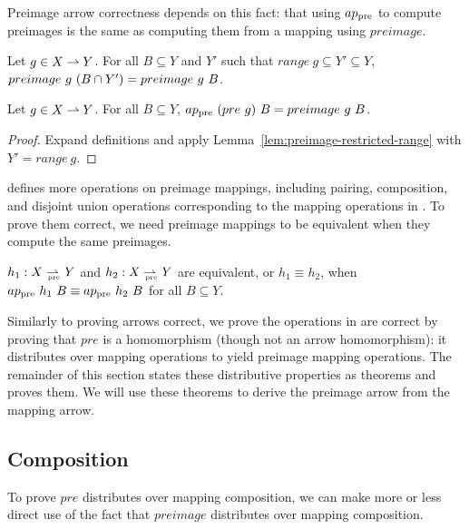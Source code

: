 Preimage arrow correctness depends on this fact: that using $ap_\mathrm{pre}$ to compute preimages is the same as computing them from a mapping using $preimage$.

\begin{lemma}
\label{lem:preimage-restricted-range}
Let $g \in X \rightharpoonup Y$.
For all $B \subseteq Y$ and $Y'$ such that $range~g \subseteq Y' \subseteq Y$, $preimage~g~(B \cap Y') = preimage~g~B$.%
\end{lemma}

\begin{theorem}
\label{thm:pre-like-preimage}
Let $g \in X \rightharpoonup Y$. For all $B \subseteq Y$, $ap_\mathrm{pre}~(pre~g)~B = preimage~g~B$.%
\end{theorem}
\begin{proof}
Expand definitions and apply Lemma~\ref{lem:preimage-restricted-range} with $Y' = range~g$.
\end{proof}

 defines more operations on preimage mappings, including pairing, composition, and disjoint union operations corresponding to the mapping operations in .
To prove them correct, we need preimage mappings to be equivalent when they compute the same preimages.

\begin{definition}
$h_1 : X \rightharpoonup_{\mspace{-19mu}_\mathrm{pre}} Y$ and $h_2 : X \rightharpoonup_{\mspace{-19mu}_\mathrm{pre}} Y$ are equivalent, or $h_1 \equiv h_2$, when $ap_\mathrm{pre}~h_1~B \equiv ap_\mathrm{pre}~h_2~B$ for all $B \subseteq Y$.
\end{definition}

Similarly to proving arrows correct, we prove the operations in  are correct by proving that $pre$ is a homomorphism (though not an arrow homomorphism): it distributes over mapping operations to yield preimage mapping operations.
The remainder of this section states these distributive properties as theorems and proves them.
We will use these theorems to derive the preimage arrow from the mapping arrow.

\subsection{Composition}

To prove $pre$ distributes over mapping composition, we can make more or less direct use of the fact that $preimage$ distributes over mapping composition.


